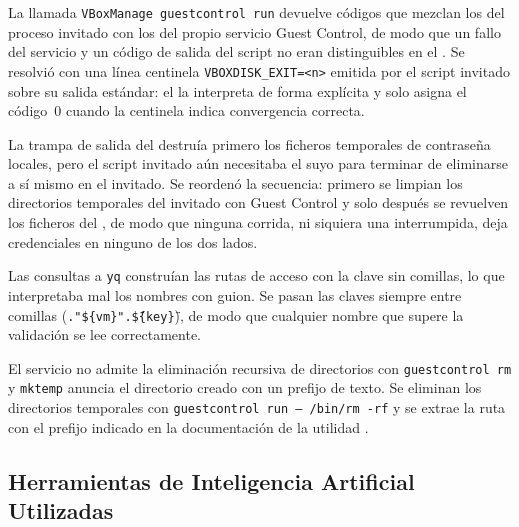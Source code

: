\begin{description}[style=nextline, leftmargin=1.2cm]
    \item[Código de salida ambiguo] La llamada \texttt{VBoxManage guestcontrol run} devuelve códigos que mezclan los del proceso invitado con los del propio servicio Guest Control, de modo que un fallo del servicio y un código de salida del script no eran distinguibles en el \host{}. Se resolvió con una línea centinela \texttt{VBOXDISK\_EXIT=<n>} emitida por el script invitado sobre su salida estándar: el \host{} la interpreta de forma explícita y solo asigna el código~0 cuando la centinela indica convergencia correcta.
    \item[Limpieza de credenciales] La trampa de salida del \host{} destruía primero los ficheros temporales de contraseña locales, pero el script invitado aún necesitaba el suyo para terminar de eliminarse a sí mismo en el invitado. Se reordenó la secuencia: primero se limpian los directorios temporales del invitado con Guest Control y solo después se revuelven los ficheros del \host{}, de modo que ninguna corrida, ni siquiera una interrumpida, deja credenciales en ninguno de los dos lados.
    \item[Nombres de \vm{} con guion] Las consultas a \texttt{yq} construían las rutas de acceso con la clave sin comillas, lo que interpretaba mal los nombres con guion. Se pasan las claves siempre entre comillas (\texttt{."\$\{vm\}".\"\$\{key\}\"}), de modo que cualquier nombre que supere la validación se lee correctamente.
    \item[Restricciones de Guest Control] El servicio no admite la eliminación recursiva de directorios con \texttt{guestcontrol rm} y \texttt{mktemp} anuncia el directorio creado con un prefijo de texto. Se eliminan los directorios temporales con \texttt{guestcontrol run -- /bin/rm -rf} y se extrae la ruta con el prefijo indicado en la documentación de la utilidad \parencite{virtualbox_guestcontrol}.
\end{description}

\subsection{Herramientas de Inteligencia Artificial Utilizadas}

